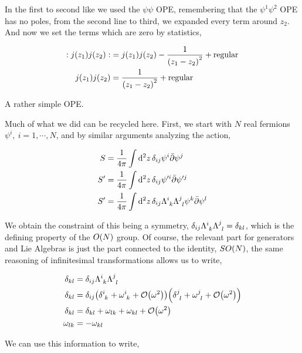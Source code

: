 In the first to second like we used the $\psi\psi$ OPE, remembering that the $\psi^1\psi^2$ OPE has no poles, from the second line to third, we expanded 
every term around $z_2$. And now we set the terms which are zero by statistics,

\begin{align*}
    :j\qty(z_1)j\qty(z_2):&=j\qty(z_1)j\qty(z_2)-\frac{1}{\qty(z_1-z_2)^2}+\textnormal{regular}\\
    j\qty(z_1)j\qty(z_2)&=\frac{1}{\qty(z_1-z_2)^2}+\textnormal{regular}
\end{align*}

A rather simple OPE.

\probitem{}
\label{3d}
Much of what we did can be recycled here. First, we start with $N$ real fermions $\psi^i,\ i=1,\cdots, N$, and by similar arguments analyzing the action,

\begin{align*}
    S&=\frac{1}{4\pi}\int\dd[2]{z}\delta_{ij}\psi^i\bar\partial\psi^j\\
    S'&=\frac{1}{4\pi}\int\dd[2]{z}\delta_{ij}\psi'^i\bar\partial\psi'^j\\
    S'&=\frac{1}{4\pi}\int\dd[2]{z}\delta_{ij}\tensor{\Lambda}{^i_k}\tensor{\Lambda}{^j_l}\psi^k\bar\partial\psi^l
\end{align*}

We obtain the constraint of this being a symmetry, $\delta_{ij}\tensor{\Lambda}{^i_k}\tensor{\Lambda}{^j_l}=\delta_{kl}$, which is the defining 
property of the $O\qty(N)$ group. Of course, the relevant part for generators and Lie Algebras is just the part connected to the identity, $SO\qty(N)$, 
the same reasoning of infinitesimal transformations allows us to write,

\begin{align*}
    \delta_{kl}&=\delta_{ij}\tensor{\Lambda}{^i_k}\tensor{\Lambda}{^j_l}\\
    \delta_{kl}&=\delta_{ij}\qty(\tensor{\delta}{^i_k}+\tensor{\omega}{^i_k}+\mathcal O\qty(\omega^2))\qty(\tensor{\delta}{^j_l}+\tensor{\omega}{^j_l}+\mathcal O\qty(\omega^2))\\
    \delta_{kl}&=\delta_{kl}+\omega_{lk}+\omega_{kl}+\mathcal O\qty(\omega^2)\\
    \omega_{lk}&=-\omega_{kl}
\end{align*}

We can use this information to write,

